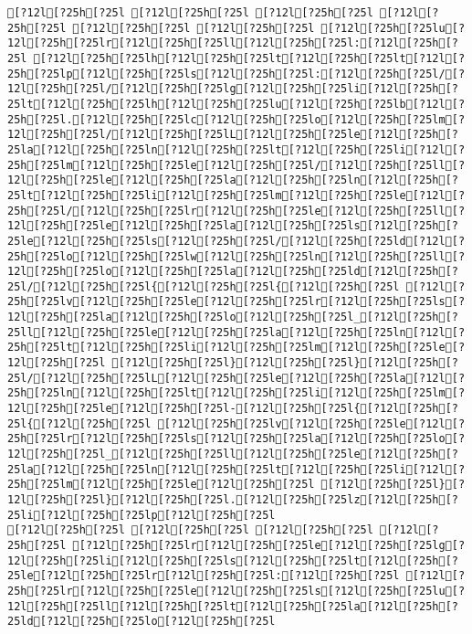 \documentclass{scrartcl}
\begin{document}
\begin{Verbatim}
[?12l[?25h[?25l [?12l[?25h[?25l [?12l[?25h[?25l [?12l[?25h[?25l [?12l[?25h[?25l [?12l[?25h[?25l [?12l[?25h[?25lu[?12l[?25h[?25lr[?12l[?25h[?25ll[?12l[?25h[?25l:[?12l[?25h[?25l [?12l[?25h[?25lh[?12l[?25h[?25lt[?12l[?25h[?25lt[?12l[?25h[?25lp[?12l[?25h[?25ls[?12l[?25h[?25l:[?12l[?25h[?25l/[?12l[?25h[?25l/[?12l[?25h[?25lg[?12l[?25h[?25li[?12l[?25h[?25lt[?12l[?25h[?25lh[?12l[?25h[?25lu[?12l[?25h[?25lb[?12l[?25h[?25l.[?12l[?25h[?25lc[?12l[?25h[?25lo[?12l[?25h[?25lm[?12l[?25h[?25l/[?12l[?25h[?25lL[?12l[?25h[?25le[?12l[?25h[?25la[?12l[?25h[?25ln[?12l[?25h[?25lt[?12l[?25h[?25li[?12l[?25h[?25lm[?12l[?25h[?25le[?12l[?25h[?25l/[?12l[?25h[?25ll[?12l[?25h[?25le[?12l[?25h[?25la[?12l[?25h[?25ln[?12l[?25h[?25lt[?12l[?25h[?25li[?12l[?25h[?25lm[?12l[?25h[?25le[?12l[?25h[?25l/[?12l[?25h[?25lr[?12l[?25h[?25le[?12l[?25h[?25ll[?12l[?25h[?25le[?12l[?25h[?25la[?12l[?25h[?25ls[?12l[?25h[?25le[?12l[?25h[?25ls[?12l[?25h[?25l/[?12l[?25h[?25ld[?12l[?25h[?25lo[?12l[?25h[?25lw[?12l[?25h[?25ln[?12l[?25h[?25ll[?12l[?25h[?25lo[?12l[?25h[?25la[?12l[?25h[?25ld[?12l[?25h[?25l/[?12l[?25h[?25l{[?12l[?25h[?25l{[?12l[?25h[?25l [?12l[?25h[?25lv[?12l[?25h[?25le[?12l[?25h[?25lr[?12l[?25h[?25ls[?12l[?25h[?25la[?12l[?25h[?25lo[?12l[?25h[?25l_[?12l[?25h[?25ll[?12l[?25h[?25le[?12l[?25h[?25la[?12l[?25h[?25ln[?12l[?25h[?25lt[?12l[?25h[?25li[?12l[?25h[?25lm[?12l[?25h[?25le[?12l[?25h[?25l [?12l[?25h[?25l}[?12l[?25h[?25l}[?12l[?25h[?25l/[?12l[?25h[?25lL[?12l[?25h[?25le[?12l[?25h[?25la[?12l[?25h[?25ln[?12l[?25h[?25lt[?12l[?25h[?25li[?12l[?25h[?25lm[?12l[?25h[?25le[?12l[?25h[?25l-[?12l[?25h[?25l{[?12l[?25h[?25l{[?12l[?25h[?25l [?12l[?25h[?25lv[?12l[?25h[?25le[?12l[?25h[?25lr[?12l[?25h[?25ls[?12l[?25h[?25la[?12l[?25h[?25lo[?12l[?25h[?25l_[?12l[?25h[?25ll[?12l[?25h[?25le[?12l[?25h[?25la[?12l[?25h[?25ln[?12l[?25h[?25lt[?12l[?25h[?25li[?12l[?25h[?25lm[?12l[?25h[?25le[?12l[?25h[?25l [?12l[?25h[?25l}[?12l[?25h[?25l}[?12l[?25h[?25l.[?12l[?25h[?25lz[?12l[?25h[?25li[?12l[?25h[?25lp[?12l[?25h[?25l
[?12l[?25h[?25l [?12l[?25h[?25l [?12l[?25h[?25l [?12l[?25h[?25l [?12l[?25h[?25lr[?12l[?25h[?25le[?12l[?25h[?25lg[?12l[?25h[?25li[?12l[?25h[?25ls[?12l[?25h[?25lt[?12l[?25h[?25le[?12l[?25h[?25lr[?12l[?25h[?25l:[?12l[?25h[?25l [?12l[?25h[?25lr[?12l[?25h[?25le[?12l[?25h[?25ls[?12l[?25h[?25lu[?12l[?25h[?25ll[?12l[?25h[?25lt[?12l[?25h[?25la[?12l[?25h[?25ld[?12l[?25h[?25lo[?12l[?25h[?25l

\end{Verbatim}
\end{document}
